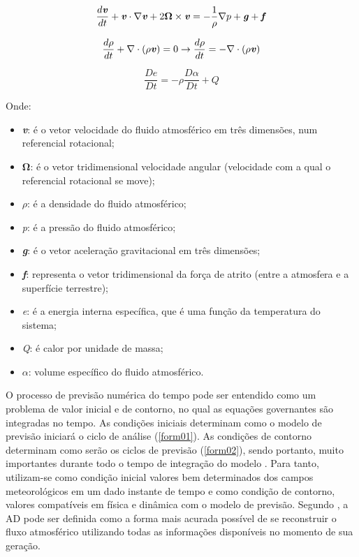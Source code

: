 \begin{equation}
\frac{d\textbf{\textit{v}}}{dt}+\textbf{\textit{v}}\cdot\nabla\textbf{\textit{v}}+2\mathbf{\Omega}\times\textbf{\textit{v}}=-\frac{1}{\rho}\nabla{p}+\textbf{\textit{g}}+\textbf{\textit{f}}
\label{form01}
\end{equation}

\begin{equation}
\frac{d\rho}{dt}+\nabla\cdot(\rho\textbf{\textit{v}})=0\rightarrow\frac{d\rho}{dt}=-\nabla\cdot(\rho\textbf{\textit{v}})
\label{form02}
\end{equation}

\begin{equation}
\frac{D\textit{e}}{D\textit{t}}=-\rho\frac{D\alpha}{D\textit{t}}+\textit{Q}
\label{form03}
\end{equation}

Onde:

\begin{itemize}
\item \textbf{\textit{v}}: é o vetor velocidade do fluido atmosférico em três dimensões, num referencial rotacional;
\item $\mathbf{\Omega}$: é o vetor tridimensional velocidade angular (velocidade com a qual o referencial rotacional se move);
\item $\rho$: é a densidade do fluido atmosférico;
\item \textit{p}: é a pressão do fluido atmosférico;
\item \textbf{\textit{g}}: é o vetor aceleração gravitacional em três dimensões;
\item \textbf{\textit{f}}: representa o vetor tridimensional da força de atrito (entre a atmosfera e a superfície terrestre);
\item \textit{e}: é a energia interna específica, que é uma função da temperatura do sistema;
\item \textit{Q}: é calor por unidade de massa;
\item $\alpha$: volume específico do fluido atmosférico. 
\end{itemize}

O processo de previsão numérica do tempo pode ser entendido como um problema de valor inicial e de contorno, no qual as equações governantes são integradas no tempo. As condições iniciais determinam como o modelo de previsão iniciará o ciclo de análise (\autoref{form01}). As condições de contorno determinam como serão os ciclos de previsão (\autoref{form02}), sendo portanto, muito importantes durante todo o tempo de integração do modelo \cite{nowosad01}. Para tanto, utilizam-se como condição inicial valores bem determinados dos campos meteorológicos em um dado instante de tempo e como condição de contorno, valores compatíveis em física e dinâmica com o modelo de previsão. Segundo \cite{talagrand97}, a AD pode ser definida como a forma mais acurada possível de se reconstruir o fluxo atmosférico utilizando todas as informações disponíveis no momento de sua geração. 

